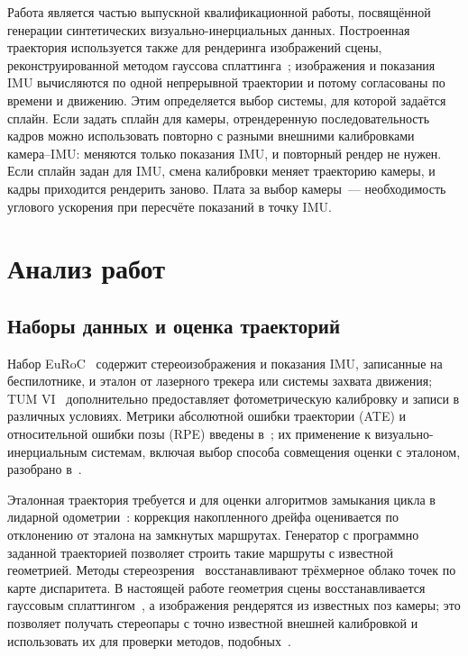 \documentclass{misisarticle}
\begin{document}
Работа является частью выпускной квалификационной работы, посвящённой генерации синтетических визуально-инерциальных данных. Построенная траектория используется также для рендеринга изображений сцены, реконструированной методом гауссова сплаттинга~\cite{kerbl}; изображения и показания IMU вычисляются по одной непрерывной траектории и потому согласованы по времени и движению. Этим определяется выбор системы, для которой задаётся сплайн. Если задать сплайн для камеры, отрендеренную последовательность кадров можно использовать повторно с разными внешними калибровками камера--IMU: меняются только показания IMU, и повторный рендер не нужен. Если сплайн задан для IMU, смена калибровки меняет траекторию камеры, и кадры приходится рендерить заново. Плата за выбор камеры~--- необходимость углового ускорения при пересчёте показаний в точку IMU.

\section{Анализ работ}

\subsection{Наборы данных и оценка траекторий}

Набор EuRoC~\cite{euroc} содержит стереоизображения и показания IMU, записанные на беспилотнике, и эталон от лазерного трекера или системы захвата движения; TUM VI~\cite{tumvi} дополнительно предоставляет фотометрическую калибровку и записи в различных условиях. Метрики абсолютной ошибки траектории (ATE) и относительной ошибки позы (RPE) введены в~\cite{sturm}; их применение к визуально-инерциальным системам, включая выбор способа совмещения оценки с эталоном, разобрано в~\cite{zhang}.

Эталонная траектория требуется и для оценки алгоритмов замыкания цикла в лидарной одометрии~\cite{epifanov}: коррекция накопленного дрейфа оценивается по отклонению от эталона на замкнутых маршрутах. Генератор с программно заданной траекторией позволяет строить такие маршруты с известной геометрией. Методы стереозрения~\cite{ermolenko} восстанавливают трёхмерное облако точек по карте диспаритета. В настоящей работе геометрия сцены восстанавливается гауссовым сплаттингом~\cite{kerbl}, а изображения рендерятся из известных поз камеры; это позволяет получать стереопары с точно известной внешней калибровкой и использовать их для проверки методов, подобных~\cite{ermolenko}.
\end{document}
